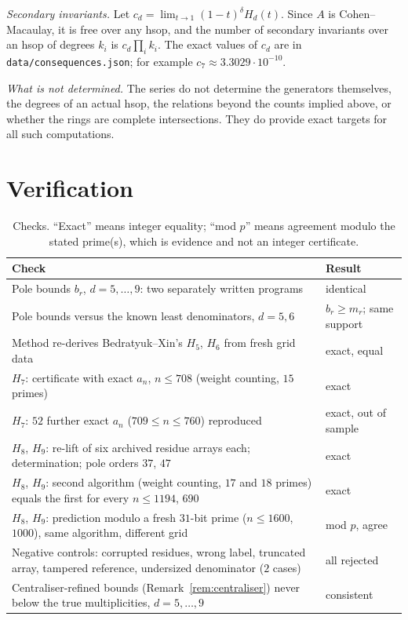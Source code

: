 \documentclass[11pt]{amsart}
\theoremstyle{definition}
\theoremstyle{remark}
\begin{document}
\emph{Secondary invariants.} Let $c_d=\lim_{t\to1}(1-t)^\delta H_d(t)$. Since $A$ is Cohen--Macaulay, it is free over any hsop, and the number of secondary invariants over an hsop of degrees $k_i$ is $c_d\prod_ik_i$. The exact values of $c_d$ are in \texttt{data/consequences.json}; for example $c_7\approx3.3029\cdot10^{-10}$.

\emph{What is not determined.} The series do not determine the generators themselves, the degrees of an actual hsop, the relations beyond the counts implied above, or whether the rings are complete intersections. They do provide exact targets for all such computations.

\section{Verification}

\begin{table}[h]\small
\caption{Checks. ``Exact'' means integer equality; ``mod $p$'' means agreement modulo the stated prime(s), which is evidence and not an integer certificate.}\label{tab:checks}
\begin{tabular}{@{}p{}p{}@{}}
\toprule
Check & Result\\
\midrule
Pole bounds $b_r$, $d=5,\dots,9$: two separately written programs & identical\\
Pole bounds versus the known least denominators, $d=5,6$ & $b_r\ge m_r$; same support\\
Method re-derives Bedratyuk--Xin's $H_5$, $H_6$ from fresh grid data & exact, equal\\
$H_7$: certificate with exact $a_n$, $n\le708$ (weight counting, $15$ primes) & exact\\
$H_7$: $52$ further exact $a_n$ ($709\le n\le760$) reproduced & exact, out of sample\\
$H_8$, $H_9$: re-lift of six archived residue arrays each; determination; pole orders $37$, $47$ & exact\\
$H_8$, $H_9$: second algorithm (weight counting, $17$ and $18$ primes) equals the first for every $n\le1194$, $690$ & exact\\
$H_8$, $H_9$: prediction modulo a fresh $31$-bit prime ($n\le1600$, $1000$), same algorithm, different grid & mod $p$, agree\\
Negative controls: corrupted residues, wrong label, truncated array, tampered reference, undersized denominator ($2$ cases) & all rejected\\
Centraliser-refined bounds (Remark~\ref{rem:centraliser}) never below the true multiplicities, $d=5,\dots,9$ & consistent\\
\bottomrule
\end{tabular}
\end{table}
\end{document}
